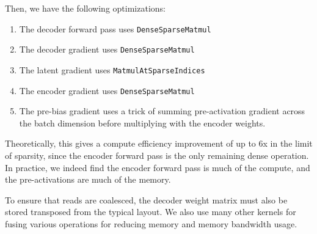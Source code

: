 Then, we have the following optimizations:
\begin{enumerate}
\item The decoder forward pass uses \texttt{DenseSparseMatmul}
\item The decoder gradient uses \texttt{DenseSparseMatmul}
\item The latent gradient uses \texttt{MatmulAtSparseIndices}
\item The encoder gradient uses \texttt{DenseSparseMatmul}
\item The pre-bias gradient uses a trick of summing pre-activation gradient across the batch dimension before multiplying with the encoder weights.
\end{enumerate}

Theoretically, this gives a compute efficiency improvement of up to 6x in the limit of sparsity, since the encoder forward pass is the only remaining dense operation. %
In practice, we indeed find the encoder forward pass is much of the compute, and the pre-activations are much of the memory.  %


To ensure that reads are coalesced, the decoder weight matrix must also be stored transposed from the typical layout.  We also use many other kernels for fusing various operations for reducing memory and memory bandwidth usage.





